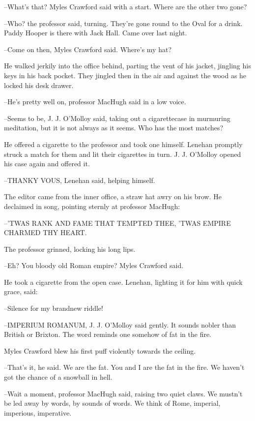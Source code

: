 --What's that? Myles Crawford said with a start. Where are the other two
gone?

--Who? the professor said, turning. They're gone round to the Oval for a
drink. Paddy Hooper is there with Jack Hall. Came over last night.

--Come on then, Myles Crawford said. Where's my hat?

He walked jerkily into the office behind, parting the vent of his jacket,
jingling his keys in his back pocket. They jingled then in the air and
against the wood as he locked his desk drawer.

--He's pretty well on, professor MacHugh said in a low voice.

--Seems to be, J. J. O'Molloy said, taking out a cigarettecase in
murmuring meditation, but it is not always as it seems. Who has the most
matches?



He offered a cigarette to the professor and took one himself. Lenehan
promptly struck a match for them and lit their cigarettes in turn. J. J.
O'Molloy opened his case again and offered it.

--THANKY VOUS, Lenehan said, helping himself.

The editor came from the inner office, a straw hat awry on his brow.
He declaimed in song, pointing sternly at professor MacHugh:


  --'TWAS RANK AND FAME THAT TEMPTED THEE,
    'TWAS EMPIRE CHARMED THY HEART.


The professor grinned, locking his long lips.

--Eh? You bloody old Roman empire? Myles Crawford said.

He took a cigarette from the open case. Lenehan, lighting it for him
with quick grace, said:

--Silence for my brandnew riddle!

--IMPERIUM ROMANUM, J. J. O'Molloy said gently. It sounds nobler than
British or Brixton. The word reminds one somehow of fat in the fire.

Myles Crawford blew his first puff violently towards the ceiling.

--That's it, he said. We are the fat. You and I are the fat in the fire.
We haven't got the chance of a snowball in hell.



--Wait a moment, professor MacHugh said, raising two quiet claws. We
mustn't be led away by words, by sounds of words. We think of Rome,
imperial, imperious, imperative.

